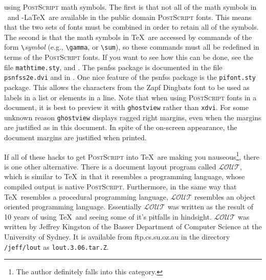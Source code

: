 \documentclass[11pt,titlepage]{article}
\def\AmS{{$\mathcal{A}$\kern-.14em\lower.5ex\hbox{$\mathcal{M}$}%
\kern-.05em$\mathcal{S}$}}
\def\AmSLaTeX{\protect\AmS-\protect\LaTeX}
\begin{document}
using \textsc{PostScript} math symbols.  The first is that not all of the math
symbols in \LaTeXe\ and \AmSLaTeX\ are available in the public domain
\textsc{PostScript} fonts.  This means that the two sets of fonts must be
combined in order to retain all of the symbols.  The second is that the math
symbols in \TeX\ are accessed by commands of the form \verb+\+\textit{symbol}
(e.g., \verb+\gamma+, or \verb+\sum+), so these commands must all be redefined
in terms of the \textsc{PostScript} fonts.  If you want to see how this can be
done, see the file \texttt{mathtime.sty}, and \cite[pages 154--156, 357--360,
and 428--433]{Knu86a}.  The \textsf{psnfss} package is documented in the file
\verb+psnfss2e.dvi+ and in \cite[pages 332--340]{Goo94a}.  One nice
feature of the \textsf{psnfss} package is the \texttt{pifont.sty} package.
This allows the characters from the \textsf{Zapf Dingbats} font to be used as
labels in a list or elements in a line.  Note that when using
\textsc{PostScript} fonts in a document, it is best to preview it with
\texttt{ghostview} rather than \texttt{xdvi}.  For some unknown reason
\texttt{ghostview} displays ragged right margins, even when the margins are
justified as in this document.  In spite of the on-screen appearance, the
document margins are justified when printed.

If all of these hacks to get \textsc{PostScript} into \TeX\ are making you
nauseous\footnote{The author definitely falls into this category.}, there is
one other alternative.  There is a document layout program called
$\mathcal{LOUT}$, which is similar to \TeX\ in that it resembles a programming
language, whose compiled output is native \textsc{PostScript}.  Furthermore,
in the same way that \TeX\ resembles a procedural programming language,
$\mathcal{LOUT}$ resembles an object oriented programming language.
Essentially $\mathcal{LOUT}$ was written as the result of 10 years of using
\TeX\ and seeing some of it's pitfalls in hindsight.  $\mathcal{LOUT}$ was
written by Jeffrey Kingston of the Basser Department of Computer Science at
the University of Sydney.  It is available from \textsf{ftp.cs.su.oz.au} in
the directory \texttt{/jeff/lout} as \texttt{lout.3.06.tar.Z}.
\end{document}
